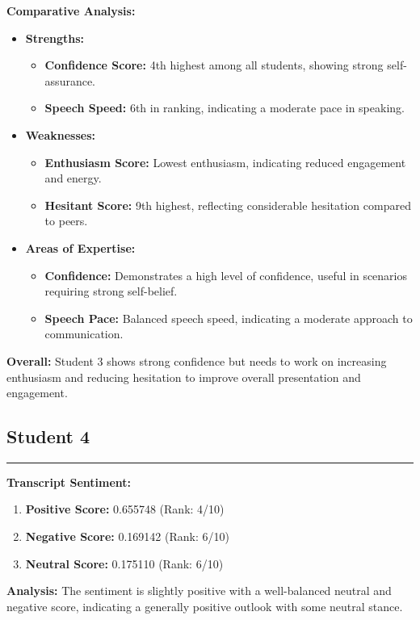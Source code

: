 \documentclass{article}
\begin{document}
\textbf{Comparative Analysis:}
\begin{itemize}
    \item \textbf{Strengths:}
    \begin{itemize}
        \item \textbf{Confidence Score:} 4th highest among all students, showing strong self-assurance.
        \item \textbf{Speech Speed:} 6th in ranking, indicating a moderate pace in speaking.
    \end{itemize}
    \item \textbf{Weaknesses:}
    \begin{itemize}
        \item \textbf{Enthusiasm Score:} Lowest enthusiasm, indicating reduced engagement and energy.
        \item \textbf{Hesitant Score:} 9th highest, reflecting considerable hesitation compared to peers.
    \end{itemize}
    \item \textbf{Areas of Expertise:}
    \begin{itemize}
        \item \textbf{Confidence:} Demonstrates a high level of confidence, useful in scenarios requiring strong self-belief.
        \item \textbf{Speech Pace:} Balanced speech speed, indicating a moderate approach to communication.
    \end{itemize}
\end{itemize}

\textbf{Overall:} Student 3 shows strong confidence but needs to work on increasing enthusiasm and reducing hesitation to improve overall presentation and engagement.

\subsection{Student 4}
\begin{center}
    \color{green}\rule{1\linewidth}{0.7mm}
\end{center}

\large{\textbf{Transcript Sentiment:}}
\begin{tcolorbox}[colback=green!5!white,colframe=green!75!black,title=Sentiment Breakdown]
    \begin{enumerate}
        \item \textbf{Positive Score:} \textcolor{green!70!black}{0.655748} (Rank: 4/10)
        \item \textbf{Negative Score:} \textcolor{red!70!black}{0.169142} (Rank: 6/10)
        \item \textbf{Neutral Score:} \textcolor{blue!70!black}{0.175110} (Rank: 6/10)
    \end{enumerate}
\end{tcolorbox}
    \textbf{Analysis:} The sentiment is slightly positive with a well-balanced neutral and negative score, indicating a generally positive outlook with some neutral stance.
\end{document}
